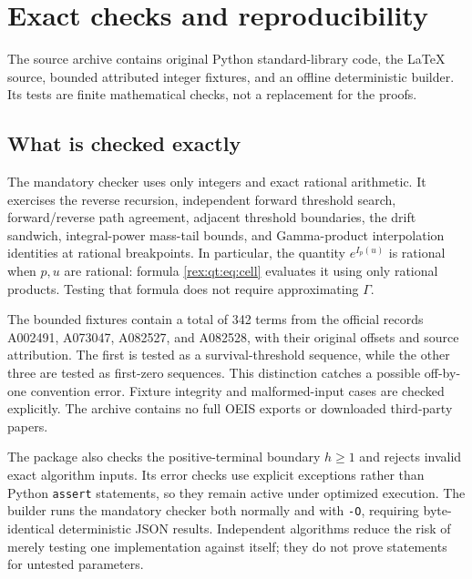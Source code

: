 \section{Exact checks and reproducibility}\label{rex:qt:sec:checks}
The source archive contains original Python standard-library code, the \LaTeX{} source, bounded attributed integer fixtures, and an offline deterministic builder. Its tests are finite mathematical checks, not a replacement for the proofs.

\subsection{What is checked exactly}
The mandatory checker uses only integers and exact rational arithmetic. It exercises the reverse recursion, independent forward threshold search, forward/reverse path agreement, adjacent threshold boundaries, the drift sandwich, integral-power mass-tail bounds, and Gamma-product interpolation identities at rational breakpoints. In particular, the quantity $e^{I_p(u)}$ is rational when $p,u$ are rational: formula \eqref{rex:qt:eq:cell} evaluates it using only rational products. Testing that formula does not require approximating $\Gamma$.

The bounded fixtures contain a total of 342 terms from the official records A002491, A073047, A082527, and A082528, with their original offsets and source attribution. The first is tested as a survival-threshold sequence, while the other three are tested as first-zero sequences. This distinction catches a possible off-by-one convention error. Fixture integrity and malformed-input cases are checked explicitly. The archive contains no full OEIS exports or downloaded third-party papers.

The package also checks the positive-terminal boundary $h\ge1$ and rejects invalid exact algorithm inputs. Its error checks use explicit exceptions rather than Python \texttt{assert} statements, so they remain active under optimized execution. The builder runs the mandatory checker both normally and with \texttt{-O}, requiring byte-identical deterministic JSON results. Independent algorithms reduce the risk of merely testing one implementation against itself; they do not prove statements for untested parameters.

